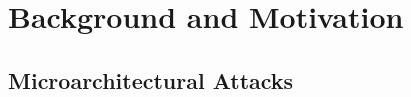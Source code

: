 \section{Background and Motivation}\label{background}
\label{motiv}
\subsection{Microarchitectural Attacks}


 





